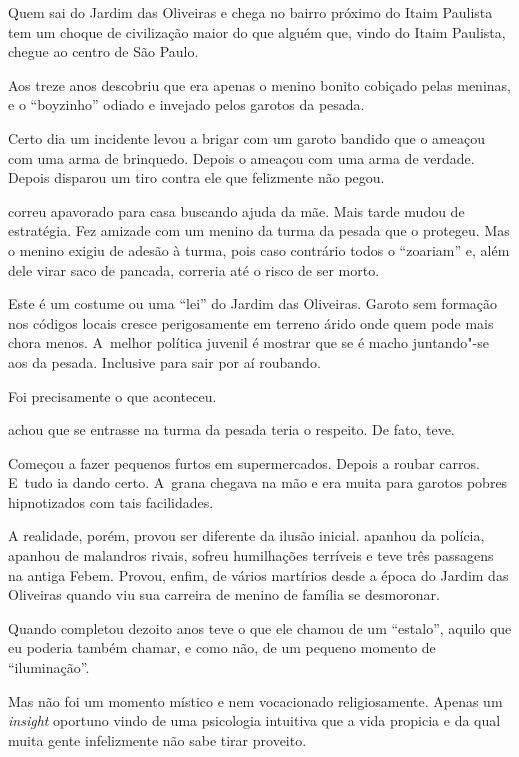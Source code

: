 Quem sai do Jardim das Oliveiras e chega no bairro próximo do Itaim
Paulista tem um choque de civilização maior do que alguém que, vindo do
Itaim Paulista, chegue ao centro de São Paulo.

\asterisc{}

Aos treze anos  descobriu que era apenas o menino bonito cobiçado
pelas meninas, e o ``boyzinho'' odiado e invejado pelos garotos da
pesada.

Certo dia um incidente levou  a brigar com um garoto bandido que o
ameaçou com uma arma de brinquedo. Depois o ameaçou com uma arma de
verdade. Depois disparou um tiro contra ele que felizmente não pegou.

 correu apavorado para casa buscando ajuda da mãe. Mais tarde mudou de
estratégia. Fez amizade com um menino da turma da pesada que o protegeu.
Mas o menino exigiu de  adesão à turma, pois caso contrário todos o
``zoariam'' e, além dele virar saco de pancada, correria até o risco de
ser morto.

Este é um costume ou uma ``lei'' do Jardim das Oliveiras. Garoto sem
formação nos códigos locais cresce perigosamente em terreno árido onde
quem pode mais chora menos. A~melhor política juvenil é mostrar que se é
macho juntando"-se aos da pesada. Inclusive para sair por aí roubando.

Foi precisamente o que aconteceu.

 achou que se entrasse na turma da pesada teria o respeito. De fato,
teve.

Começou a fazer pequenos furtos em supermercados. Depois a roubar
carros. E~tudo ia dando certo. A~grana chegava na mão e era muita para
garotos pobres hipnotizados com tais facilidades.

A realidade, porém, provou ser diferente da ilusão inicial.  apanhou
da polícia, apanhou de malandros rivais, sofreu humilhações terríveis e
teve três passagens na antiga Febem. Provou, enfim, de vários martírios
desde a época do Jardim das Oliveiras quando viu sua carreira de menino
de família se desmoronar.

Quando completou dezoito anos  teve o que ele chamou de um ``estalo'',
aquilo que eu poderia também chamar, e como não, de um pequeno momento
de ``iluminação''.

Mas não foi um momento místico e nem vocacionado religiosamente. Apenas
um \emph{insight} oportuno vindo de uma psicologia intuitiva que a vida
propicia e da qual muita gente infelizmente não sabe tirar proveito.

